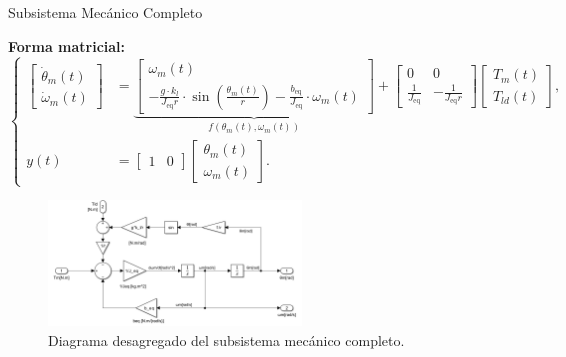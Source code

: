 \documentclass[12pt]{beamer}
\begin{document}
\begin{frame}{Subsistema Mecánico Completo}\footnotesize

\textbf{Forma matricial:}
\begin{equation}
\left\{
\begin{aligned}
\begin{bmatrix}
    \dot{\theta}_m(t) \\
    \dot{\omega}_m(t)
\end{bmatrix}
&=
\underbrace{
\begin{bmatrix}
    \omega_m(t) \\
    -\frac{g \cdot k_l}{J_{\text{eq}} r} \cdot \sin\left(\frac{\theta_m(t)}{r}\right) -\frac{b_{\text{eq}}}{J_{\text{eq}}} \cdot \omega_m(t) 
\end{bmatrix}
}_{f(\theta_m(t),\omega_m(t))}
+
\begin{bmatrix}
    0 & 0 \\
    \frac{1}{J_{\text{eq}}} & -\frac{1}{J_{\text{eq}} r}
\end{bmatrix}
\begin{bmatrix}
    T_m(t) \\
    T_{ld}(t)
\end{bmatrix}, \\
y(t) &=
\begin{bmatrix}
    1 & 0
\end{bmatrix}
\begin{bmatrix}
    \theta_m(t) \\
    \omega_m(t)
\end{bmatrix}.
\end{aligned}
\right.
\end{equation}
    \begin{figure}[H]
        \centering
        \includegraphics[width=0.6\textwidth]{Imagenes/bloque_subsistema_mecanico.png}
        \caption{Diagrama desagregado del subsistema mecánico completo.}
    \end{figure}
\end{frame}
\end{document}
